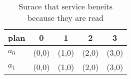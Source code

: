 \documentclass[a4paper]{article}
\begin{document}
\begin{table}
\begin{adjustbox}{width=0.7\columnwidth}
\begin{tabular}{|l|l|l|l|l|}
\hline
\textbf{plan} & \multicolumn{1}{c|}{\textbf{0}} & \multicolumn{1}{c|}{\textbf{1}} & \multicolumn{1}{c|}{\textbf{2}} & \multicolumn{1}{c|}{\textbf{3}} \\ \hline
\textbf{$a_0$}  & (0,0) & (1,0) & (2,0) & (3,0) \\ \hline
\textbf{$a_1$}  & (0,0) & (1,0) & (2,0) & (3,0) \\ \hline
\end{tabular}
\end{adjustbox}
\caption{Surace that service beneits because they are read
}
\end{table}
\end{document}
